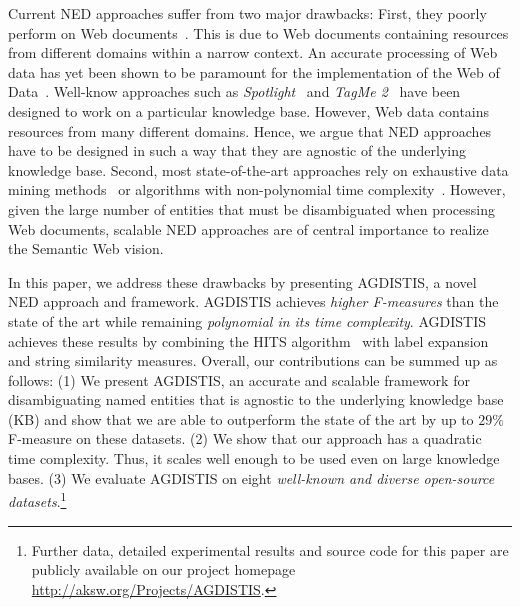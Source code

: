 \documentclass{llncs}
\begin{document}
Current NED approaches suffer from two major drawbacks:
First, they poorly perform on Web documents~\cite{RatinovRo09}.
This is due to Web documents containing resources from different domains within a narrow context.
An accurate processing of Web data has yet been shown to be paramount for the implementation of the Web of Data~\cite{GER+13}.
Well-know approaches such as \emph{Spotlight}~\cite{spotlight} and \emph{TagMe 2}~\cite{TagMe2} have been designed to work on a particular knowledge base.
However, Web data contains resources from many different domains.
Hence, we argue that NED approaches have to be designed in such a way that they are agnostic of the underlying knowledge base.
Second, most state-of-the-art approaches rely on exhaustive data mining methods~\cite{Cucerzan07,rat:rot} or algorithms with non-polynomial time complexity~\cite{Kleb11WIMS}.
However, given the large number of entities that must be disambiguated when processing Web documents, scalable NED approaches are of central importance to realize the Semantic Web vision.

In this paper, we address these drawbacks by presenting AGDISTIS, a novel NED approach and framework.
AGDISTIS achieves \emph{higher F-measures} than the state of the art while remaining \emph{polynomial in its time complexity}.
AGDISTIS achieves these results by combining the HITS algorithm~\cite{HITS} with label expansion and string similarity measures.
Overall, our contributions can be summed up as follows:
(1) We present AGDISTIS, an accurate and scalable framework for disambiguating named entities that is agnostic to the underlying knowledge base (KB) and show that we are able to outperform the state of the art by up to $29\%$ F-measure on these datasets.
(2) We show that our approach has a quadratic time complexity. Thus, it scales well enough to be used even on large knowledge bases.
(3) We evaluate AGDISTIS on eight \emph{well-known and diverse open-source datasets}.\footnote{Further data, detailed experimental results and source code for this paper are publicly available on our project homepage \url{http://aksw.org/Projects/AGDISTIS}.} 
\end{document}
